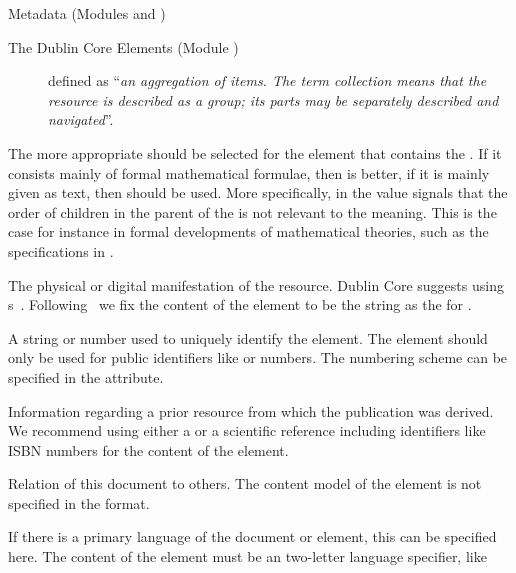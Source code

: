 \begin{tchapter}[id=metadata,short=Metadata]{Metadata (Modules {} and  {})}
\begin{tsection}[id=dc-elements]{The Dublin Core Elements (Module {})}
\begin{description}
\begin{description}
  \item[{}] defined as ``{\emph{an aggregation of items. The term collection means that
      the resource is described as a group; its parts may be separately described and
      navigated}}''.
  \end{description}
  The more appropriate should be selected for the element that contains the
  {}. If it consists mainly of formal mathematical formulae, then
  {} is better, if it is mainly given as text, then {}
  should be used. More specifically, in {\omdoc} the value {} signals
  that the order of children in the parent of the {} is not relevant to
  the meaning. This is the case for instance in formal developments of mathematical
  theories, such as the specifications in {}.
\item[{\element[ns-elt=dc]{format}}] The physical or digital manifestation of the
  resource.  Dublin Core suggests using {s}~\cite{FreBor:MIME96}.
  Following~\cite{MurLau:xmt01} we fix the content of the {}
  element to be the string {} as the {}
  for {\omdoc}.
\item[{\element[ns-elt=dc]{identifier}}] A string or number used to uniquely identify the
  element.  The {} element should only be used
  for public identifiers like {} or {} numbers. The
  numbering scheme can be specified in the {}
  attribute.
\item[{\element[ns-elt=dc]{source}}] Information regarding a prior resource from which the
  publication was derived. We recommend using either a {} or a scientific
  reference including identifiers like ISBN numbers for the content of the
  {} element.
\item[{\element[ns-elt=dc]{relation}}] Relation of this document to others.  The content
  model of the {} element is not specified in the {\omdoc}
  format.
\item[{\element[ns-elt=dc]{language}}] If there is a primary language of the document or
  element, this can be specified here. The content of the {}
  element must be an {} two-letter language specifier, like

\end{description}
\end{tsection}
\end{tchapter}

